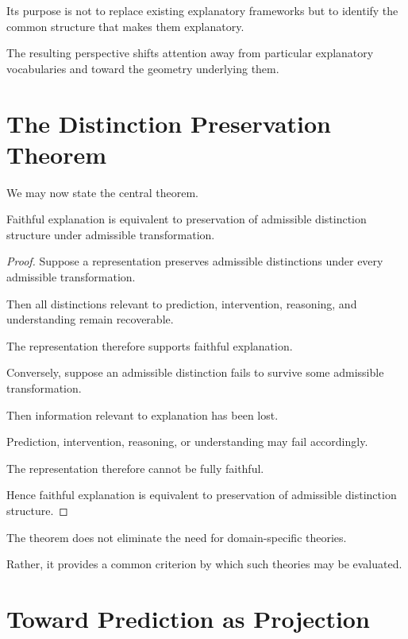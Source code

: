 \documentclass[11pt,oneside,openany]{book}
\begin{document}
Its purpose is not to replace existing explanatory frameworks but to identify the common structure that makes them explanatory.

The resulting perspective shifts attention away from particular explanatory vocabularies and toward the geometry underlying them.

\section{The Distinction Preservation Theorem}

We may now state the central theorem.

\begin{theorem}

Faithful explanation is equivalent to preservation of admissible distinction structure under admissible transformation.

\end{theorem}

\begin{proof}

Suppose a representation preserves admissible distinctions under every admissible transformation.

Then all distinctions relevant to prediction, intervention, reasoning, and understanding remain recoverable.

The representation therefore supports faithful explanation.

Conversely, suppose an admissible distinction fails to survive some admissible transformation.

Then information relevant to explanation has been lost.

Prediction, intervention, reasoning, or understanding may fail accordingly.

The representation therefore cannot be fully faithful.

Hence faithful explanation is equivalent to preservation of admissible distinction structure.

\end{proof}

The theorem does not eliminate the need for domain-specific theories.

Rather, it provides a common criterion by which such theories may be evaluated.

\section{Toward Prediction as Projection}
\end{document}
